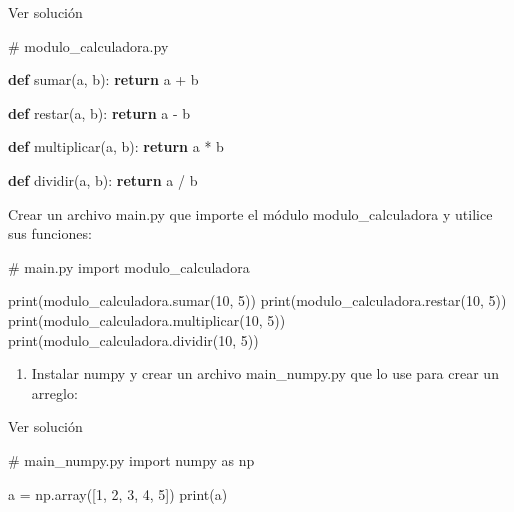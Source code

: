 \documentclass[
  a4paper,
  DIV=11,
  numbers=noendperiod,
  onepage,
  openany]{scrreprt}
\newenvironment{Shaded}{\begin{snugshade}}{\end{snugshade}}
\newcommand{\BuiltInTok}[1]{\textcolor[rgb]{0.00,0.23,0.31}{#1}}
\newcommand{\CommentTok}[1]{\textcolor[rgb]{0.37,0.37,0.37}{#1}}
\newcommand{\ControlFlowTok}[1]{\textcolor[rgb]{0.00,0.23,0.31}{\textbf{#1}}}
\newcommand{\DecValTok}[1]{\textcolor[rgb]{0.68,0.00,0.00}{#1}}
\newcommand{\ImportTok}[1]{\textcolor[rgb]{0.00,0.46,0.62}{#1}}
\newcommand{\KeywordTok}[1]{\textcolor[rgb]{0.00,0.23,0.31}{\textbf{#1}}}
\newcommand{\NormalTok}[1]{\textcolor[rgb]{0.00,0.23,0.31}{#1}}
\newcommand{\OperatorTok}[1]{\textcolor[rgb]{0.37,0.37,0.37}{#1}}
\providecommand{\tightlist}{%
  \setlength{\itemsep}{0pt}\setlength{\parskip}{0pt}}\usepackage{longtable,booktabs,array}
\begin{document}
Ver solución

\begin{Shaded}
\begin{Highlighting}[]
\CommentTok{\# modulo\_calculadora.py}

\KeywordTok{def}\NormalTok{ sumar(a, b):}
    \ControlFlowTok{return}\NormalTok{ a }\OperatorTok{+}\NormalTok{ b}

\KeywordTok{def}\NormalTok{ restar(a, b):}
    \ControlFlowTok{return}\NormalTok{ a }\OperatorTok{{-}}\NormalTok{ b}

\KeywordTok{def}\NormalTok{ multiplicar(a, b):}
    \ControlFlowTok{return}\NormalTok{ a }\OperatorTok{*}\NormalTok{ b}

\KeywordTok{def}\NormalTok{ dividir(a, b):}
    \ControlFlowTok{return}\NormalTok{ a }\OperatorTok{/}\NormalTok{ b}
\end{Highlighting}
\end{Shaded}

Crear un archivo main.py que importe el módulo modulo\_calculadora y
utilice sus funciones:

\begin{Shaded}
\begin{Highlighting}[]
\CommentTok{\# main.py}
\ImportTok{import}\NormalTok{ modulo\_calculadora}

\BuiltInTok{print}\NormalTok{(modulo\_calculadora.sumar(}\DecValTok{10}\NormalTok{, }\DecValTok{5}\NormalTok{))}
\BuiltInTok{print}\NormalTok{(modulo\_calculadora.restar(}\DecValTok{10}\NormalTok{, }\DecValTok{5}\NormalTok{))}
\BuiltInTok{print}\NormalTok{(modulo\_calculadora.multiplicar(}\DecValTok{10}\NormalTok{, }\DecValTok{5}\NormalTok{))}
\BuiltInTok{print}\NormalTok{(modulo\_calculadora.dividir(}\DecValTok{10}\NormalTok{, }\DecValTok{5}\NormalTok{))}
\end{Highlighting}
\end{Shaded}

\begin{enumerate}
\def\labelenumi{\arabic{enumi}.}
\setcounter{enumi}{1}
\tightlist
\item
  Instalar numpy y crear un archivo main\_numpy.py que lo use para crear
  un arreglo:
\end{enumerate}

Ver solución

\begin{Shaded}
\begin{Highlighting}[]
\CommentTok{\# main\_numpy.py}
\ImportTok{import}\NormalTok{ numpy }\ImportTok{as}\NormalTok{ np}

\NormalTok{a }\OperatorTok{=}\NormalTok{ np.array([}\DecValTok{1}\NormalTok{, }\DecValTok{2}\NormalTok{, }\DecValTok{3}\NormalTok{, }\DecValTok{4}\NormalTok{, }\DecValTok{5}\NormalTok{])}
\BuiltInTok{print}\NormalTok{(a)}
\end{Highlighting}
\end{Shaded}
\end{document}
